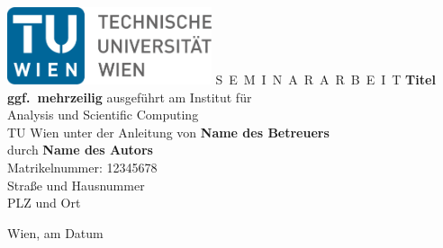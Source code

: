 \documentclass[a4paper,11pt,bibliography=totoc,listof=totoc,headinclude=true,cleardoublepage=empty,oneside]{NumPDEsThesis}
\begin{document}


\begin{titlepage}
  \begin{center}
    \includegraphics[width=0.45\textwidth]{figures/TULogo.pdf}
    \vskip 1cm%
    {\LARGE S~\Large E~M~I~N~A~R~A~R~B~E~I~T}
    \vskip 8mm
    {\huge\bfseries\color{change}Titel \\[1ex] ggf.\ mehrzeilig}
    \vskip 1cm
    \large 
    ausgef\"uhrt am    
    \vskip 0.75cm
    {\Large Institut f\"ur\\[1ex] Analysis und Scientific Computing}\\[1ex]
    {\Large TU Wien}
    \vskip0.75cm
    unter der Anleitung von
    \vskip0.75cm
    {\Large\bfseries\color{change}Name des Betreuers}\\[1ex]
    \vskip 0.5cm
    durch
    \vskip 0.5cm
    {\Large\bfseries\color{change}Name des Autors}\\[1ex]
    Matrikelnummer: {\color{change}12345678}\\[1ex]
    {\color{change}Straße und Hausnummer}\\[1ex]
    {\color{change}PLZ und Ort}
  \end{center}
  
  \vfill
  
  \small
  Wien, am {\color{change} Datum} %
  \vspace*{-15mm}
\end{titlepage}

\cleardoublepage



\tableofcontents
\end{document}
